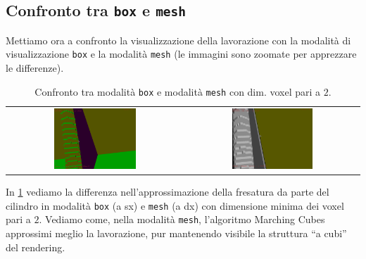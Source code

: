 \subsection{Confronto tra \texttt{box} e \texttt{mesh}}
Mettiamo ora a confronto la visualizzazione della lavorazione con la modalità di visualizzazione \texttt{box} e la modalità \texttt{mesh} (le immagini sono zoomate per apprezzare le differenze).
\begin{center}
\begin{table}[h]
  \begin{tabular}{cc}
   \includegraphics[width=0.48\textwidth]{img/screenshots/pos2_box_v2_2.png} &%
   \includegraphics[width=0.48\textwidth]{img/screenshots/pos2_mesh_v2_2.png}\\
  \end{tabular}
  \caption{Confronto tra modalità \texttt{box} e modalità \texttt{mesh} con dim. voxel pari a $2$.}
  \label{tab:confrontobm1}
\end{table}
\end{center}

In \ref{tab:confrontobm1} vediamo la differenza nell'approssimazione della fresatura da parte del cilindro in modalità \texttt{box} (a sx) e \texttt{mesh} (a dx) con dimensione minima dei voxel pari a $2$. Vediamo come, nella modalità \texttt{mesh}, l'algoritmo Marching Cubes approssimi meglio la lavorazione, pur mantenendo visibile la struttura ``a cubi'' del rendering.

